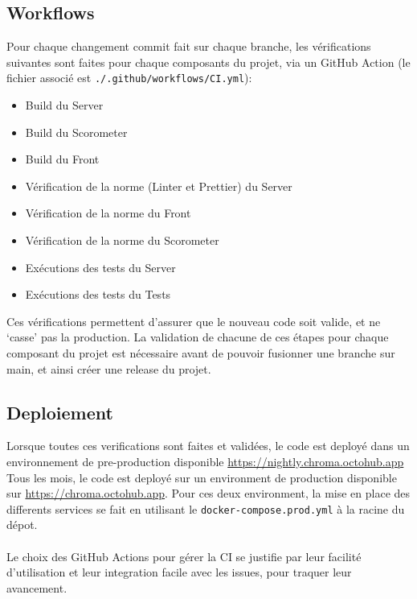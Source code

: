 
\subsection{Workflows}
	Pour chaque changement commit fait sur chaque branche, les vérifications suivantes sont faites pour chaque composants du projet, via un GitHub Action (le fichier associé est \verb|./.github/workflows/CI.yml|):

	\begin{itemize}
		\item Build du Server
		\item Build du Scorometer
		\item Build du Front
		\item Vérification de la norme (Linter et Prettier) du Server
		\item Vérification de la norme du Front
		\item Vérification de la norme du Scorometer
		\item Exécutions des tests du Server
		\item Exécutions des tests du Tests
	\end{itemize}

	Ces vérifications permettent d’assurer que le nouveau code soit valide, et ne ‘casse’ pas la production.
	La validation de chacune de ces étapes pour chaque composant du projet est nécessaire avant de pouvoir fusionner une branche sur main, et ainsi créer une release du projet.

\subsection{Deploiement}
	Lorsque toutes ces verifications sont faites et validées, le code est deployé dans un environnement de pre-production disponible \url{https://nightly.chroma.octohub.app}
	Tous les mois, le code est deployé sur un environment de production disponible sur \url{https://chroma.octohub.app}. Pour ces deux environment, la mise en place des differents services se fait en utilisant le \verb|docker-compose.prod.yml| à la racine du dépot.
	\\\\
	Le choix des GitHub Actions pour gérer la CI se justifie par leur facilité d'utilisation et leur integration facile avec les issues, pour traquer leur avancement.
